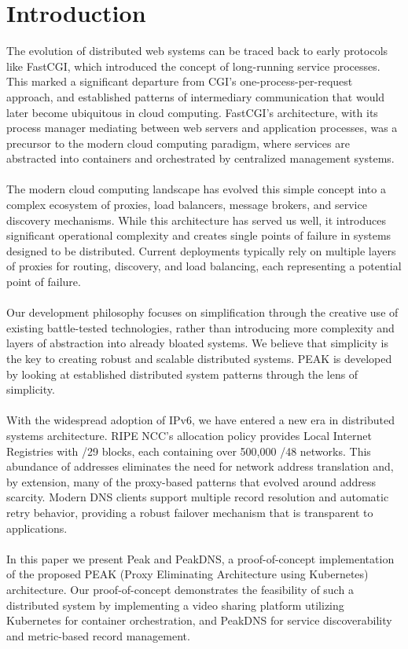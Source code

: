 \documentclass[12pt]{article}
\begin{document}
\section{Introduction}
The evolution of distributed web systems can be traced back to early protocols like FastCGI, which introduced the concept of long-running service processes.
This marked a significant departure from CGI's one-process-per-request approach,
and established patterns of intermediary communication that would later become ubiquitous in cloud computing.
FastCGI's architecture, with its process manager mediating between web servers and application processes, was a precursor to the modern cloud computing paradigm,
where services are abstracted into containers and orchestrated by centralized management systems.
\\
\\
The modern cloud computing landscape has evolved this simple concept into a complex ecosystem of proxies,
load balancers, message brokers, and service discovery mechanisms. While this architecture has served us well, it introduces
significant operational complexity and creates single points of failure in systems designed to be distributed.
Current deployments typically rely on multiple layers of proxies for routing, discovery, and load balancing, each representing
a potential point of failure.
\\
\\
Our development philosophy focuses on simplification through the creative use of existing battle-tested technologies, rather than introducing 
more complexity and layers of abstraction into already bloated systems. We believe that simplicity is the key to creating robust and scalable 
distributed systems. PEAK is developed by looking at established distributed system patterns through the lens of simplicity.
\\
\\
With the widespread adoption of IPv6, we have entered a new era in distributed systems architecture. RIPE NCC's allocation policy
provides Local Internet Registries with /29 blocks, each containing over 500,000 /48 networks. This abundance of addresses eliminates
the need for network address translation and, by extension, many of the proxy-based patterns that evolved around address scarcity.
Modern DNS clients support multiple record resolution and automatic retry behavior, providing a robust failover mechanism that is 
transparent to applications.
\\
\\
In this paper we present Peak and PeakDNS, a proof-of-concept implementation of the proposed PEAK (Proxy Eliminating Architecture using Kubernetes) architecture.
Our proof-of-concept demonstrates the feasibility of such a distributed system by implementing 
a video sharing platform utilizing Kubernetes for container orchestration,
and PeakDNS for service discoverability and metric-based record management.
\end{document}
